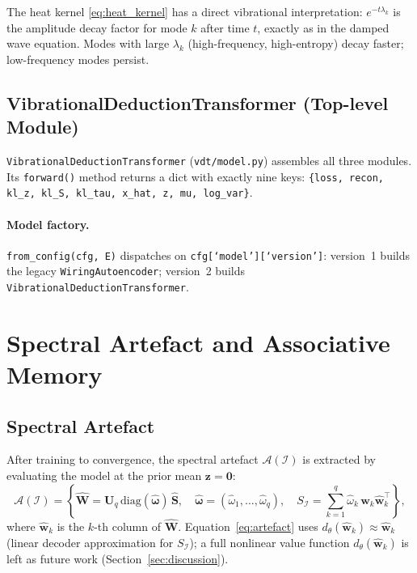 \documentclass[11pt,a4paper]{article}
\newcommand{\I}{\mathcal{I}}
\newcommand{\A}{\mathcal{A}}
\newcommand{\diag}{\mathrm{diag}}
\newcommand{\bU}{\bm{U}}
\newcommand{\bS}{\bm{S}}
\newcommand{\bW}{\bm{W}}
\newcommand{\bz}{\bm{z}}
\newcommand{\bomega}{\bm{\omega}}
\begin{document}
The heat kernel \eqref{eq:heat_kernel} has a direct vibrational
interpretation: $e^{-t\lambda_k}$ is the amplitude decay factor for mode $k$
after time $t$, exactly as in the damped wave equation.  Modes with large
$\lambda_k$ (high-frequency, high-entropy) decay faster; low-frequency modes
persist.

\subsection{VibrationalDeductionTransformer (Top-level Module)}

\texttt{VibrationalDeductionTransformer} (\texttt{vdt/model.py}) assembles all
three modules.  Its \texttt{forward()} method returns a dict with exactly nine
keys: \texttt{\{loss, recon, kl\_z, kl\_S, kl\_tau, x\_hat, z, mu, log\_var\}}.

\paragraph{Model factory.}
\texttt{from\_config(cfg, E)} dispatches on
\texttt{cfg[`model'][`version']}: version~1 builds the legacy
\texttt{WiringAutoencoder}; version~2 builds
\texttt{VibrationalDeductionTransformer}.

\section{Spectral Artefact and Associative Memory}
\label{sec:memory}

\subsection{Spectral Artefact}

After training to convergence, the spectral artefact $\A(\I)$ is extracted
by evaluating the model at the prior mean $\bz=\mathbf{0}$:
\begin{equation}
  \A(\I) = \left\{
    \hat{\bW} = \bU_q\,\diag(\hat{\bomega})\,\hat{\bS},
    \quad
    \hat{\bomega} = (\hat{\omega}_1,\dots,\hat{\omega}_q),
    \quad
    S_{\I} = \sum_{k=1}^q \hat{\omega}_k\,\hat{\bm{w}}_k\hat{\bm{w}}_k^\top
  \right\},
  \label{eq:artefact}
\end{equation}
where $\hat{\bm{w}}_k$ is the $k$-th column of $\hat{\bW}$.
Equation~\eqref{eq:artefact} uses
$d_{\theta}(\hat{\bm{w}}_k)\approx\hat{\bm{w}}_k$ (linear decoder
approximation for $S_{\I}$); a full nonlinear value function
$d_{\theta}(\hat{\bm{w}}_k)$ is left as future work (Section~\ref{sec:discussion}).
\end{document}
